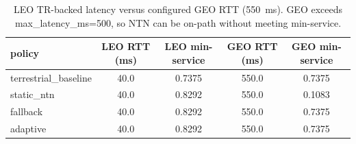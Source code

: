 \begin{table}[h]\centering
\caption{LEO TR-backed latency versus configured GEO RTT (550~ms). GEO exceeds max\_latency\_ms=500, so NTN can be on-path without meeting min-service.}
\begin{tabular}{lcccc}\toprule
policy & LEO RTT (ms) & LEO min-service & GEO RTT (ms) & GEO min-service \\\midrule
terrestrial\_baseline & 40.0 & 0.7375 & 550.0 & 0.7375 \\
static\_ntn & 40.0 & 0.8292 & 550.0 & 0.1083 \\
fallback & 40.0 & 0.8292 & 550.0 & 0.7375 \\
adaptive & 40.0 & 0.8292 & 550.0 & 0.7375 \\
\bottomrule\end{tabular}\end{table}
